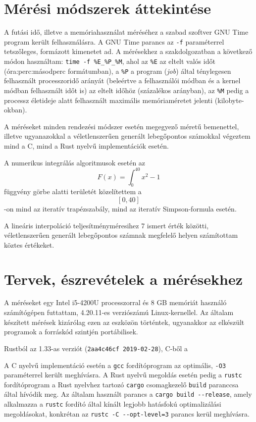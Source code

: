 

\section{Mérési módszerek áttekintése}

A futási idő, illetve a memóriahasználat méréséhez a szabad szoftver GNU Time program került felhasználásra. A GNU Time parancs az \lstinline{-f} paraméterrel tetszőleges, formázott kimenetet ad. A mérésekhez a szakdolgozatban a következő módon használtam: \lstinline{time -f %E_%P_%M}, ahol az \lstinline{%E} az eltelt valós időt (óra:perc:másodperc formátumban), a \lstinline{%P} a program (\textit{job}) által ténylegesen felhasznált processzoridő arányát (beleértve a felhasználói módban és a kernel módban felhasznált időt is) az eltelt időhöz (százalékos arányban), az \lstinline{%M} pedig a processz életideje alatt felhasznált maximális memóriaméretet jelenti (kilobyte-okban).

A méréseket minden rendezési módszer esetén megegyező méretű bemenettel, illetve ugyanazokkal a véletlenszerűen generált lebegőpontos számokkal végeztem mind a C, mind a Rust nyelvű implementációk esetén.

A numerikus integrálás algoritmusok esetén az \[ F(x) = \int_0^{40} x^2 - 1 \] függvény görbe alatti területét közelítettem a \[\left[0, 40\right]\]-on mind az iteratív trapézszabály, mind az iteratív Simpson-formula esetén.

A lineáris interpoláció teljesítményméresihez 7 ismert érték közötti, véletlenszerűen generált lebegőpontos számnak megfelelő helyen számítottam köztes értékeket.

\section{Tervek, észrevételek a mérésekhez}

A méréseket egy Intel i5-4200U processzorral és 8 GB memóriát használó számítógépen futtattam, 4.20.11-es verziószámú Linux-kernellel. Az általam készített mérések kizárólag ezen az eszközön történtek, ugyanakkor az elkészült programok a forráskód szintjén portábilisek.

Rustból az 1.33-as verziót (\lstinline{2aa4c46cf 2019-02-28}), C-ből a %

A C nyelvű implementáció esetén a \lstinline{gcc} fordítóprogram az optimális, \lstinline{-O3} paraméterrel került meghívásra. A Rust nyelvű megoldás esetén pedig a \lstinline{rustc} fordítóprogram a Rust nyelvhez tartozó \lstinline{cargo} csomagkezelő \lstinline{build} paranccsa által hívódik meg. Az általam használt parancs a \lstinline{cargo build --release}, amely alkalmazza a \lstinline{rustc} fordító által kínált legjobb hatásfokú optimalizálási megoldásokat, konkrétan az \lstinline{rustc -C --opt-level=3} parancs kerül meghívásra.
